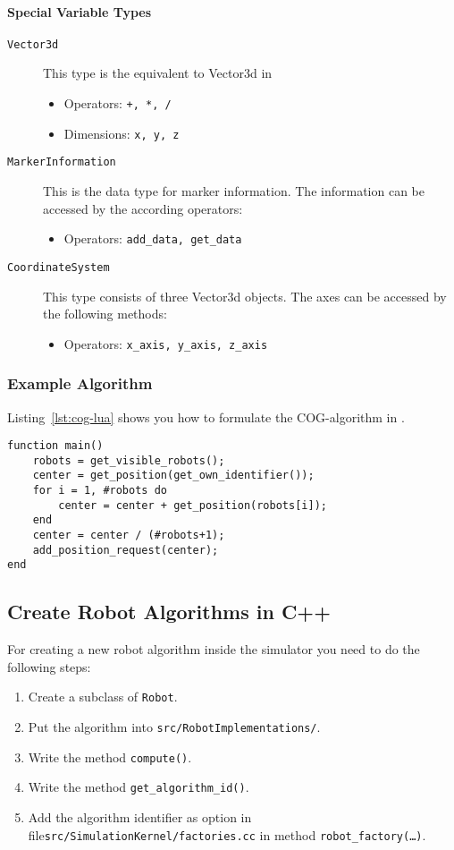 \paragraph{Special Variable Types}
\begin{description}
	\item [\texttt{Vector3d}] This type is the \Lua equivalent to Vector3d in \RSS
	\begin{itemize}
		\item Operators: \texttt{+, *, /}
		\item Dimensions: \texttt{x, y, z}
	\end{itemize}
	\item [\texttt{MarkerInformation}] This is the data type for marker information. The information can be accessed by the according operators:
	\begin{itemize}
		\item Operators: \texttt{add\_data, get\_data}
	\end{itemize}
	\item [\texttt{CoordinateSystem}] This type consists of three Vector3d objects. The axes can be accessed by the following methods:
	\begin{itemize}
		\item Operators: \texttt{x\_axis, y\_axis, z\_axis}
	\end{itemize}

\end{description}

\subsubsection{Example Algorithm}
Listing~\ref{lst:cog-lua} shows you how to formulate the COG-algorithm in \Lua.

\lstset{language=lua}
\begin{lstlisting}[caption={COG algorithm in \Lua},label=lst:cog-lua]
function main() 
    robots = get_visible_robots();
    center = get_position(get_own_identifier());
    for i = 1, #robots do
        center = center + get_position(robots[i]);
    end
    center = center / (#robots+1);
    add_position_request(center);
end
\end{lstlisting}

\subsection{Create Robot Algorithms in C++}
For creating a new robot algorithm inside the simulator you need to do the following steps:
\begin{enumerate}
	\item Create a subclass of \texttt{Robot}.
	\item Put the algorithm into \texttt{src/RobotImplementations/}.
	\item Write the method \texttt{compute()}.
	\item Write the method \texttt{get\_algorithm\_id()}.
	\item Add the algorithm identifier as option in file\newline \texttt{src/SimulationKernel/factories.cc} in method \texttt{robot\_factory(\dots)}.
\end{enumerate}

